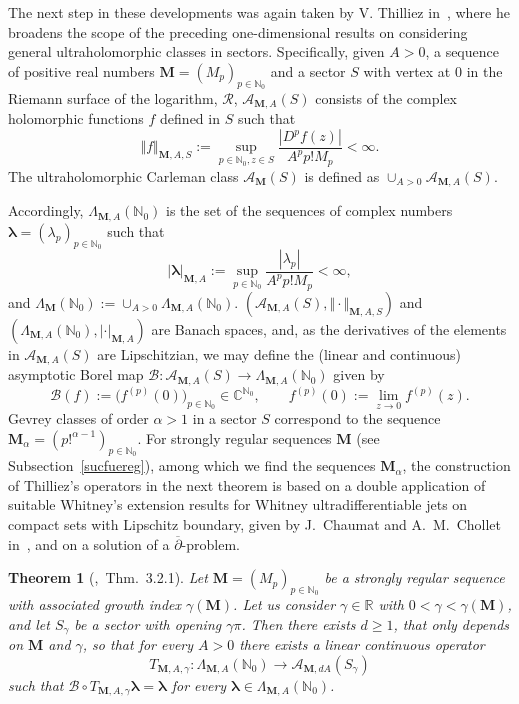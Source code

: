\documentclass[11pt,a4paper,leqno]{article}
\theoremstyle{plain}
\newtheorem{theo}{Theorem}[section]
\theoremstyle{definition}
\def\C{\mathbb{C}}
\def\N{\mathbb{N}}
\def\R{\mathbb{R}}
\def\a{\alpha}
\def\ga{\gamma}
\def\blambda{\boldsymbol{\lambda}}
\def\bM{\boldsymbol{M}}
\begin{document}
The next step in these developments was again taken by V. Thilliez in~\cite{thilliez}, where he broadens the scope of the preceding one-dimensional results on considering general ultraholomorphic classes in sectors.
Specifically, given $A>0$, a sequence of positive real numbers $\bM=(M_{p})_{p\in\N_{0}}$ and a sector $S$ with vertex at $0$ in the Riemann surface of the logarithm, $\mathcal{R}$,
$\mathcal{A}_{\bM,A}(S)$ consists of the complex holomorphic functions $f$ defined in $S$ such that
$$\Vert f\Vert_{\bM,A,S}:=\sup_{p\in\N_{0},z\in S}\frac{|D^{p}f(z)|}{A^{p}p!M_{p}}<\infty.$$
The ultraholomorphic Carleman class $\mathcal{A}_{\bM}(S)$ is defined as $\cup_{A>0}\mathcal{A}_{\bM,A}(S)$.\par
Accordingly, $\Lambda_{\bM,A}(\N_{0})$ is the set of the sequences of complex numbers
$\blambda=(\lambda_{p})_{p\in\N_{0}}$ such that
$$|\blambda|_{\bM,A}:=\sup_{p\in\N_{0}}\frac{|\lambda_{p}|}{A^{p}p!M_{p}}<\infty,$$
and $\Lambda_{\bM}(\N_0):=\cup_{A>0}\Lambda_{\bM,A}(\N_0)$.
$(\mathcal{A}_{\bM,A}(S),\Vert \cdot\Vert_{\bM,A,S})$ and $(\Lambda_{\bM,A}(\N_{0}),|\cdot|_{\bM,A})$ are Banach spaces,
and, as the derivatives of the elements in $\mathcal{A}_{\bM,A}(S)$ are Lipschitzian, we may define the (linear and continuous) asymptotic Borel map $\mathcal{B}:\mathcal{A}_{\bM,A}(S)\to\Lambda_{\bM,A}(\N_{0})$ given by
$$
\mathcal{B}(f):=
\big(f^{(p)}(0)\big)_{p\in\N_{0}}\in\C^{\N_{0}},\qquad f^{(p)}(0):=\lim_{z\to0}f^{(p)}(z).
$$
Gevrey classes of order $\a>1$ in a sector $S$ correspond to the sequence $\bM_{\a}=(p!^{\a-1})_{p\in\N_0}$.
For strongly regular sequences $\bM$ (see Subsection~\ref{sucfuereg}), among which we find the sequences $\bM_{\a}$, the construction of Thilliez's operators in the next theorem is based on a double application of suitable Whitney's extension results for Whitney ultradifferentiable jets on compact sets with Lipschitz boundary, given by
J.~Chaumat and A.~M.~Chollet in~\cite{chaucho}, and on a solution of a $\overline{\partial}$-problem.

\begin{theo}[\cite{thilliez},\ Thm.\ 3.2.1]
\label{teorthilliez}
Let $\bM=(M_{p})_{p\in\N_{0}}$ be a strongly regular sequence with associated growth index $\ga(\bM)$. Let us consider $\ga\in\R$ with $0<\ga<\ga(\bM)$,
and let $S_{\gamma}$ be a sector with opening $\ga\pi$. Then there exists $d\ge 1$, that only depends on $\bM$ and $\ga$, so that for every $A>0$ there exists a linear continuous operator
$$T_{\bM,A,\ga}:\Lambda_{\bM,A}(\N_{0})\longrightarrow \mathcal{A}_{\bM,dA}(S_{\ga})$$
such that $\mathcal{B}\circ T_{\bM,A,\ga}\blambda=\blambda$ for every $\blambda\in\Lambda_{\bM,A}(\N_{0})$.
\end{theo}
\end{document}
